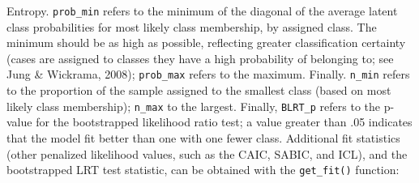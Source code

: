 \documentclass[man]{apa6}
\begin{document}
Entropy. \texttt{prob\_min} refers to the minimum of the diagonal of the average latent class probabilities for most likely class membership, by assigned class. The minimum should be as high as possible, reflecting greater classification certainty (cases are assigned to classes they have a high probability of belonging to; see Jung \& Wickrama, 2008); \texttt{prob\_max}
refers to the maximum. Finally. \texttt{n\_min} refers to the proportion of the sample assigned to the smallest class (based on most likely class membership); \texttt{n\_max} to the largest. Finally, \texttt{BLRT\_p} refers to the p-value for the bootstrapped likelihood ratio test; a value greater than .05 indicates that the model fit better than one with one fewer class.
Additional fit statistics (other penalized likelihood values, such as the CAIC, SABIC, and ICL), and the bootstrapped LRT
test statistic, can be obtained with the \texttt{get\_fit()} function:
\end{document}
